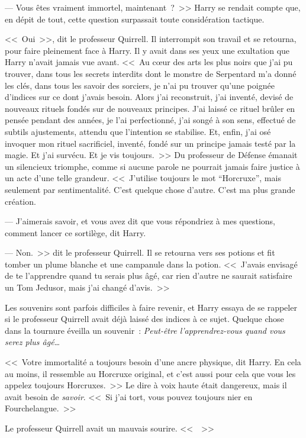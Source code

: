 --- Vous êtes vraiment immortel, maintenant~?~>> Harry se rendait compte que, en dépit de tout, cette question surpassait toute considération tactique.

<<~Oui~>>, dit le professeur Quirrell. Il interrompit son travail et se retourna, pour faire pleinement face à Harry. Il y avait dans ses yeux une exultation que Harry n'avait jamais vue avant. <<~Au cœur des arts les plus noirs que j'ai pu trouver, dans tous les secrets interdits dont le monstre de Serpentard m'a donné les clés, dans tous les savoir des sorciers, je n'ai pu trouver qu'une poignée d'indices sur ce dont j'avais besoin. Alors j'ai reconstruit, j'ai inventé, devisé de nouveaux rituels fondés sur de nouveaux principes. J'ai laissé ce rituel brûler en pensée pendant des années, je l'ai perfectionné, j'ai songé à son sens, effectué de subtils ajustements, attendu que l'intention se stabilise. Et, enfin, j'ai osé invoquer mon rituel sacrificiel, inventé, fondé sur un principe jamais testé par la magie. Et j'ai survécu. Et je vis toujours.~>> Du professeur de Défense émanait un silencieux triomphe, comme si aucune parole ne pourrait jamais faire justice à un acte d'une telle grandeur. <<~J'utilise toujours le mot “Horcruxe”, mais seulement par sentimentalité. C'est quelque chose d'autre. C'est ma plus grande création.

--- J'aimerais savoir, et vous avez dit que vous répondriez à mes questions, comment lancer ce sortilège, dit Harry.

--- Non.~>> dit le professeur Quirrell. Il se retourna vers ses potions et fit tomber un plume blanche et une campanule dans la potion. <<~J'avais envisagé de te l'apprendre quand tu serais plus âgé, car rien d'autre ne saurait satisfaire un Tom Jedusor, mais j'ai changé d'avis.~>>

Les souvenirs sont parfois difficiles à faire revenir, et Harry essaya de se rappeler si le professeur Quirrell avait déjà laissé des indices à ce sujet. Quelque chose dans la tournure éveilla un souvenir~: \emph{Peut-être l'apprendrez-vous quand vous serez plus âgé…}

<<~Votre immortalité a toujours besoin d'une ancre physique, dit Harry. En cela au moins, il ressemble au Horcruxe original, et c'est aussi pour cela que vous les appelez toujours Horcruxes.~>> Le dire à voix haute était dangereux, mais il avait besoin de \emph{savoir}. <<~Si j'ai tort, vous pouvez toujours nier en Fourchelangue.~>>

Le professeur Quirrell avait un mauvais sourire. <<~~>>

